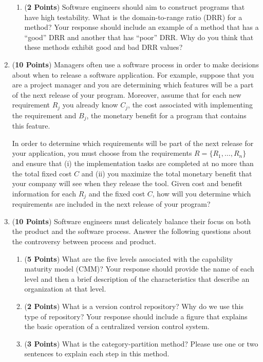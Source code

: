 \documentclass{article}
\theoremstyle{definition}
\begin{document}
\begin{enumerate}
\begin{enumerate}
  \item ({\bf 2 Points}) Software engineers should aim to construct
    programs that have high testability.  What is the domain-to-range
    ratio (DRR) for a method?  Your response should include an example
    of a method that has a ``good'' DRR and another that has ``poor''
    DRR.  Why do you think that these methods exhibit good and bad DRR
    values?

  \end{enumerate}

\newpage
         
\item ({\bf 10 Points}) Managers often use a software process in order
  to make decisions about when to release a software application.  For
  example, suppose that you are a project manager and you are
  determining which features will be a part of the next release of
  your program.  Moreover, assume that for each new requirement $R_j$
  you already know $C_j$, the cost associated with implementing the
  requirement and $B_j$, the monetary benefit for a program that
  contains this feature.

  In order to determine which requirements will be part of the next
  release for your application, you must choose from the requirements
  $R = \{ R_1, \ldots, R_n \}$ and ensure that (i) the implementation
  tasks are completed at no more than the total fixed cost $C$ and
  (ii) you maximize the total monetary benefit that your company will
  see when they release the tool.  Given cost and benefit information
  for each $R_j$ and the fixed cost $C$, how will you determine which
  requirements are included in the next release of your program?
    
\newpage 

\item ({\bf 10 Points}) Software engineers must delicately balance
  their focus on both the product and the software process.  Answer
  the following questions about the controversy between process and
  product.

\begin{enumerate}

\item ({\bf 5 Points}) What are the five levels associated with the
  capability maturity model (CMM)?  Your response should provide the
  name of each level and then a brief description of the
  characteristics that describe an organization at that level.

\item ({\bf 2 Points}) What is a version control repository?  Why do
  we use this type of repository?  Your response should include a
  figure that explains the basic operation of a centralized version
  control system.

\item ({\bf 3 Points}) What is the category-partition method?  Please
  use one or two sentences to explain each step in this method.
 
\end{enumerate}






\end{enumerate}
\end{document}
